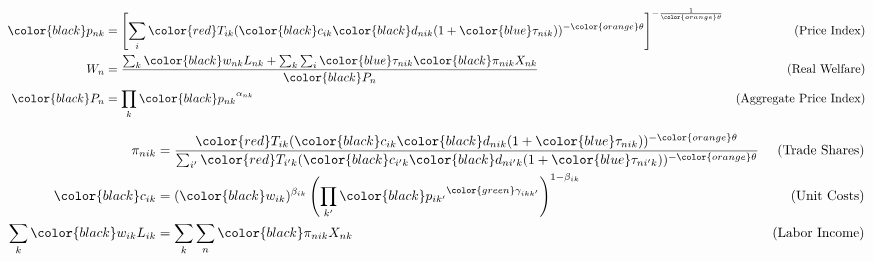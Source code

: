 \begin{align*}
    {\color{black}p_{nk}} &= \left[ \sum_{i} {\color{red}T_{ik}} ({\color{black}c_{ik}} {\color{black}d_{nik}} (1 + {\color{blue}\tau_{nik}}))^{-{\color{orange}\theta}} \right]^{-\frac{1}{{\color{orange}\theta}}} & \text{(Price Index)} \\
    W_n &= \frac{\sum_{k} {\color{black}w_{nk}} L_{nk} + \sum_{k} \sum_{i} {\color{blue}\tau_{nik}} {\color{black}\pi_{nik}} X_{nk}}{{\color{black}P_n}} & \text{(Real Welfare)} \\
    {\color{black}P_n} &= \prod_{k} {\color{black}p_{nk}}^{\alpha_{nk}} & \text{(Aggregate Price Index)}
\end{align*}

\begin{align*}
    \pi_{nik} &= \frac{{\color{red}T_{ik}} ({\color{black}c_{ik}} {\color{black}d_{nik}} (1 + {\color{blue}\tau_{nik}}))^{-{\color{orange}\theta}}}{\sum_{i'} {\color{red}T_{i'k}} ({\color{black}c_{i'k}} {\color{black}d_{ni'k}} (1 + {\color{blue}\tau_{ni'k}}))^{-{\color{orange}\theta}}} & \text{(Trade Shares)} \\
    {\color{black}c_{ik}} &= ({\color{black}w_{ik}})^{\beta_{ik}} \left(\prod_{k'} {\color{black}p_{ik'}}^{{\color{green}\gamma_{ikk'}}}\right)^{1 - \beta_{ik}} & \text{(Unit Costs)} \\
   \sum_{k} {\color{black}w_{ik}} L_{ik} &= \sum_{k} \sum_{n} {\color{black}\pi_{nik}} X_{nk} & \text{(Labor Income)}
\end{align*}
